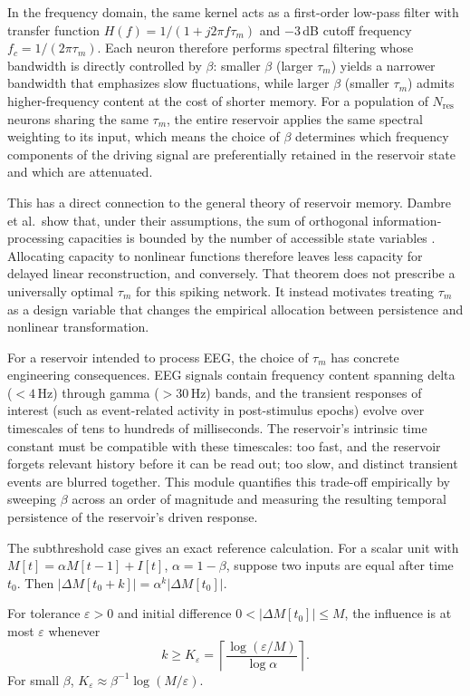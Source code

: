 In the frequency domain, the same kernel acts as a first-order low-pass filter with transfer function $H(f) = 1/(1 + j2\pi f \tau_m)$ and $-3$\,dB cutoff frequency $f_c = 1/(2\pi\tau_m)$. Each neuron therefore performs spectral filtering whose bandwidth is directly controlled by $\beta$: smaller $\beta$ (larger $\tau_m$) yields a narrower bandwidth that emphasizes slow fluctuations, while larger $\beta$ (smaller $\tau_m$) admits higher-frequency content at the cost of shorter memory. For a population of $N_{\text{res}}$ neurons sharing the same $\tau_m$, the entire reservoir applies the same spectral weighting to its input, which means the choice of $\beta$ determines which frequency components of the driving signal are preferentially retained in the reservoir state and which are attenuated.

This has a direct connection to the general theory of reservoir memory. Dambre et al.\ show that, under their assumptions, the sum of orthogonal information-processing capacities is bounded by the number of accessible state variables \cite{dambre_2012}. Allocating capacity to nonlinear functions therefore leaves less capacity for delayed linear reconstruction, and conversely. That theorem does not prescribe a universally optimal $\tau_m$ for this spiking network. It instead motivates treating $\tau_m$ as a design variable that changes the empirical allocation between persistence and nonlinear transformation.

For a reservoir intended to process EEG, the choice of $\tau_m$ has concrete engineering consequences. EEG signals contain frequency content spanning delta ($<4$\,Hz) through gamma ($>30$\,Hz) bands, and the transient responses of interest (such as event-related activity in post-stimulus epochs) evolve over timescales of tens to hundreds of milliseconds. The reservoir's intrinsic time constant must be compatible with these timescales: too fast, and the reservoir forgets relevant history before it can be read out; too slow, and distinct transient events are blurred together. This module quantifies this trade-off empirically by sweeping $\beta$ across an order of magnitude and measuring the resulting temporal persistence of the reservoir's driven response.

The subthreshold case gives an exact reference calculation. For a scalar unit
with $M[t]=\alpha M[t-1]+I[t]$, $\alpha=1-\beta$, suppose two inputs are equal
after time $t_0$. Then $|\Delta M[t_0+k]|=\alpha^k|\Delta M[t_0]|$.

\begin{proposition}
\label{prop:subthreshold_horizon}
For tolerance $\varepsilon>0$ and initial difference
$0<|\Delta M[t_0]|\le M$, the influence is at most $\varepsilon$ whenever
\begin{equation}
k\ge K_\varepsilon
=\left\lceil\frac{\log(\varepsilon/M)}{\log\alpha}\right\rceil.
\end{equation}
For small $\beta$, $K_\varepsilon\approx \beta^{-1}\log(M/\varepsilon)$.
\end{proposition}

